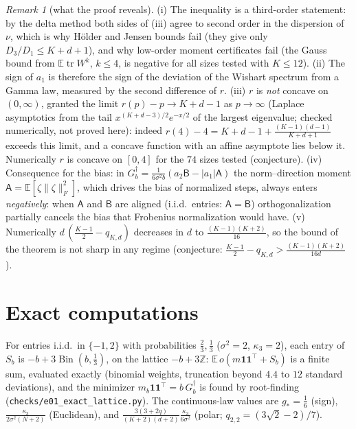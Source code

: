 \documentclass[10pt]{article}
\theoremstyle{definition}
\theoremstyle{remark}
\newtheorem{remark}[theorem]{Remark}
\newcommand{\Z}{\mathbb{Z}}
\newcommand{\E}{\mathbb{E}}
\newcommand{\nF}[1]{\|#1\|_{F}}
\newcommand{\tr}{\operatorname{tr}}
\newcommand{\cA}{\mathsf{A}}
\newcommand{\cB}{\mathsf{B}}
\newcommand{\ones}{\mathbf{1}}
\newcommand{\st}{\dagger}
\begin{document}
\begin{remark}[what the proof reveals]\label{rem:a1}
(i) The inequality is a third-order statement: by the delta method both sides of (iii) agree to second order in the
dispersion of $\nu$, which is why H\"older and Jensen bounds fail (they give only $D_3/D_1\le K+d+1$), and why low-order
moment certificates fail (the Gauss bound from $\E\tr W^k$, $k\le4$, is negative for all sizes tested with $K\le12$).
(ii) The sign of $a_1$ is therefore the sign of the deviation of the Wishart spectrum from a Gamma law, measured by the
second difference of $r$. (iii) $r$ is \emph{not} concave on $(0,\infty)$, granted the limit $r(p)-p\to K+d-1$ as $p\to\infty$ (Laplace asymptotics from the tail $x^{(K+d-3)/2}e^{-x/2}$ of the largest eigenvalue; checked numerically, not proved here):
indeed $r(4)-4=K+d-1+\frac{(K-1)(d-1)}{K+d+1}$ exceeds this limit, and a concave function with an affine
asymptote lies below it. Numerically $r$ is concave on $[0,4]$ for the $74$ sizes tested (conjecture). (iv) Consequence
for the bias: in $G^\st_b=\frac1{6\sigma^2b}(a_2\cB-|a_1|\cA)$ the norm--direction moment $\cA=\E[\zeta\nF\zeta^2]$, which
drives the bias of normalized steps, always enters \emph{negatively}: when $\cA$ and $\cB$ are aligned (i.i.d.\ entries:
$\cA=\cB$) orthogonalization partially cancels the bias that Frobenius normalization would have. (v) Numerically
$d\,(\frac{K-1}2-q_{K,d})$ decreases in $d$ to $\frac{(K-1)(K+2)}{16}$, so the bound of the theorem is not sharp in any
regime (conjecture: $\frac{K-1}2-q_{K,d}>\frac{(K-1)(K+2)}{16d}$).
\end{remark}

\section{Exact computations}\label{sec:num}

For entries i.i.d.\ in $\{-1,2\}$ with probabilities $\frac23,\frac13$ ($\sigma^2=2$, $\kappa_3=2$), each entry of
$S_b$ is $-b+3\operatorname{Bin}(b,\frac13)$, on the lattice $-b+3\Z$: $\E\,o(m\ones\ones^\top+S_b)$ is a finite sum,
evaluated exactly (binomial weights, truncation beyond $4.4$ to $12$ standard deviations), and the minimizer
$m_b\ones\ones^\top=b\,G_b^\st$ is found by root-finding (\texttt{checks/e01\_exact\_lattice.py}). The continuous-law values
are $g_\ast=\frac16$ (sign), $\frac{\kappa_3}{2\sigma^2(N+2)}$ (Euclidean), and $\frac{3(3+2q)}{(K+2)(d+2)}\frac{\kappa_3}{6\sigma^2}$
(polar; $q_{2,2}=(3\sqrt2-2)/7$).
\end{document}

